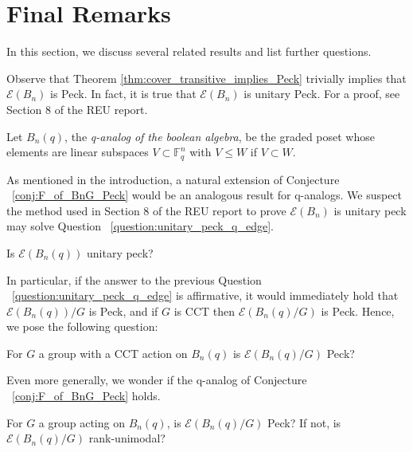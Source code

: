\documentclass[smallextended, envcountsame, numbook]{svjour3}
\numberwithin{equation}{section}
\begin{document}
\section{Final Remarks}

In this section, we discuss several related results and list further questions. 

\begin{remark}
Observe that Theorem \ref{thm:cover_transitive_implies_Peck} trivially implies that $\mathcal E(B_n)$ is Peck. In fact, it is true that $\mathcal E(B_n)$ is unitary Peck. For a proof, see Section 8 of the REU report.
\end{remark}

\begin{definition}
Let $B_n(q)$, the {\it q-analog of the boolean algebra}, be the graded poset whose elements are linear subspaces $V \subset \mathbb F_q^n$ with $V \leq W$ if $V \subset W$.
\end{definition}

As mentioned in the introduction, a natural extension of Conjecture ~\ref{conj:F_of_BnG_Peck} would be an analogous result for q-analogs. We suspect the method used in Section 8 of the REU report to prove $\mathcal E(B_n)$ is unitary peck may solve Question ~\ref{question:unitary_peck_q_edge}.

\begin{question}
\label{question:unitary_peck_q_edge}
Is $\mathcal E(B_n(q))$ unitary peck?
\end{question}


In particular, if the answer to the previous Question ~\ref{question:unitary_peck_q_edge} is affirmative, it would immediately hold that $\mathcal E(B_n(q))/G$ is Peck, and if $G$ is CCT then $\mathcal E(B_n(q)/G)$ is Peck. Hence, we pose the following question: 

\begin{question}
For $G$ a group with a CCT action on $B_n(q)$ is $\mathcal E(B_n(q)/G)$ Peck?
\end{question}

Even more generally, we wonder if the q-analog of Conjecture ~\ref{conj:F_of_BnG_Peck} holds.

\begin{question}
For $G$ a group acting on $B_n(q)$, is $\mathcal E(B_n(q)/G)$ Peck? If not, is $\mathcal E(B_n(q)/G)$ rank-unimodal?
\end{question}
\end{document}
